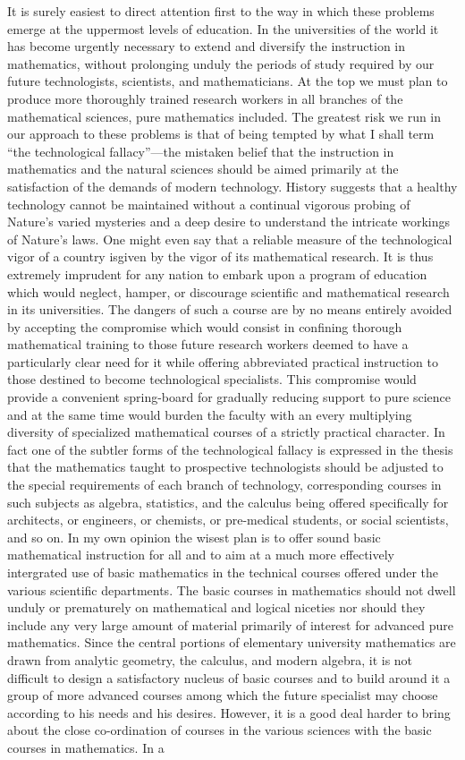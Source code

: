 It is surely easiest to direct attention first to the way in which these problems emerge at the uppermost levels of education. In the universities of the world it has become urgently necessary to extend and diversify the instruction in mathematics, without prolonging unduly the periods of study required by our future technologists, scientists, and mathematicians. At the top we must plan to produce more thoroughly trained research workers in all branches of the mathematical sciences, pure mathematics included. The greatest risk we run in our approach to these problems is that of being tempted by what I shall term ``the technological fallacy''---the mistaken belief that the instruction in mathematics and the natural sciences should be aimed primarily at the satisfaction of the demands of modern technology. History suggests that a healthy technology cannot be maintained without a continual vigorous probing of Nature's varied mysteries and a deep desire to understand the intricate workings of Nature's laws. One might even say that a reliable measure of the technological vigor of a country is\pageoriginale given by the vigor of its mathematical research. It is thus extremely imprudent for any nation to embark upon a program of education which would neglect, hamper, or discourage scientific and mathematical research in its universities. The dangers of such a course are by no means entirely avoided by accepting the compromise which would consist in confining thorough mathematical training to those future research workers deemed to have a particularly clear need for it while offering abbreviated practical instruction to those destined to become technological specialists. This compromise would provide a convenient spring-board for gradually reducing support to pure science and at the same time would burden the faculty with an every multiplying diversity of specialized mathematical courses of a strictly practical character. In fact one of the subtler forms of the technological fallacy is expressed in the thesis that the mathematics taught to prospective technologists should be adjusted to the special requirements of each branch of technology, corresponding courses in such subjects as algebra, statistics, and the calculus being offered specifically for architects, or engineers, or chemists, or pre-medical students, or social scientists, and so on. In my own opinion the wisest plan is to offer sound basic mathematical instruction for all and to aim at a much more effectively intergrated use of basic mathematics in the technical courses offered under the various scientific departments. The basic courses in mathematics should not dwell unduly or prematurely on mathematical and logical niceties nor should they include any very large amount of material primarily of interest for advanced pure mathematics. Since the central portions of elementary university mathematics are drawn from analytic geometry, the calculus, and modern algebra, it is not difficult to design a satisfactory nucleus of basic courses and to build around it a group of more advanced courses among which the future specialist may choose according to his needs and his desires. However, it is a good deal harder to bring about the close co-ordination of courses in the various sciences with the basic courses in mathematics. In a 